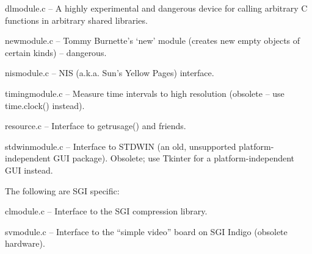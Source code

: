 dlmodule.c --  A highly experimental and dangerous device for calling
arbitrary C functions in arbitrary shared libraries.

newmodule.c -- Tommy Burnette's `new' module (creates new empty
objects of certain kinds) -- dangerous.

nismodule.c -- NIS (a.k.a. Sun's Yellow Pages) interface.

timingmodule.c -- Measure time intervals to high resolution (obsolete
-- use time.clock() instead).

resource.c -- Interface to getrusage() and friends.

stdwinmodule.c -- Interface to STDWIN (an old, unsupported
platform-independent GUI package).  Obsolete; use Tkinter for a
platform-independent GUI instead.

The following are SGI specific:

clmodule.c -- Interface to the SGI compression library.

svmodule.c -- Interface to the ``simple video'' board on SGI Indigo
(obsolete hardware).
